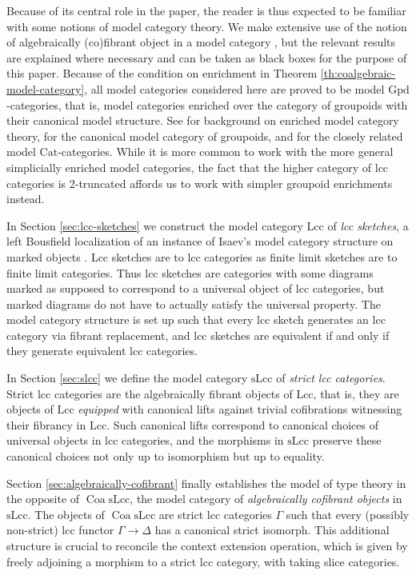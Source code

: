 \documentclass[a4paper]{article}
\theoremstyle{remark}
\theoremstyle{definition}
\begin{document}
Because of its central role in the paper, the reader is thus expected to be familiar with some notions of model category theory.
We make extensive use of the notion of algebraically (co)fibrant object in a model category \citep{algebraic-models,coalgebraic-models}, but the relevant results are explained where necessary and can be taken as black boxes for the purpose of this paper.
Because of the condition on enrichment in Theorem \ref{th:coalgebraic-model-category}, all model categories considered here are proved to be model $\mathrm{Gpd}$-categories, that is, model categories enriched over the category of groupoids with their canonical model structure.
See \citet{enriched-model-cats} for background on enriched model category theory, \citet{groupoid-model-cat} for the canonical model category of groupoids, and \citet{homotopy-theoretic-aspects} for the closely related model $\mathrm{Cat}$-categories.
While it is more common to work with the more general simplicially enriched model categories, the fact that the higher category of lcc categories is 2-truncated affords us to work with simpler groupoid enrichments instead.

In Section \ref{sec:lcc-sketches} we construct the model category $\mathrm{Lcc}$ of \emph{lcc sketches}, a left Bousfield localization of an instance of Isaev's model category structure on marked objects \citep{marked-objects}.
Lcc sketches are to lcc categories as finite limit sketches are to finite limit categories.
Thus lcc sketches are categories with some diagrams marked as supposed to correspond to a universal object of lcc categories, but marked diagrams do not have to actually satisfy the universal property.
The model category structure is set up such that every lcc sketch generates an lcc category via fibrant replacement, and lcc sketches are equivalent if and only if they generate equivalent lcc categories.

In Section \ref{sec:slcc} we define the model category $\mathrm{sLcc}$ of \emph{strict lcc categories}.
Strict lcc categories are the algebraically fibrant objects of $\mathrm{Lcc}$, that is, they are objects of $\mathrm{Lcc}$ \emph{equipped} with canonical lifts against trivial cofibrations witnessing their fibrancy in $\mathrm{Lcc}$.
Such canonical lifts correspond to canonical choices of universal objects in lcc categories, and the morphisms in $\mathrm{sLcc}$ preserve these canonical choices not only up to isomorphism but up to equality.

Section \ref{sec:algebraically-cofibrant} finally establishes the model of type theory in the opposite of $\operatorname{Coa} \mathrm{sLcc}$, the model category of \emph{algebraically cofibrant objects} in $\mathrm{sLcc}$.
The objects of $\operatorname{Coa} \mathrm{sLcc}$ are strict lcc categories $\Gamma$ such that every (possibly non-strict) lcc functor $\Gamma \rightarrow \Delta$ has a canonical strict isomorph.
This additional structure is crucial to reconcile the context extension operation, which is given by freely adjoining a morphism to a strict lcc category, with taking slice categories.
\end{document}
